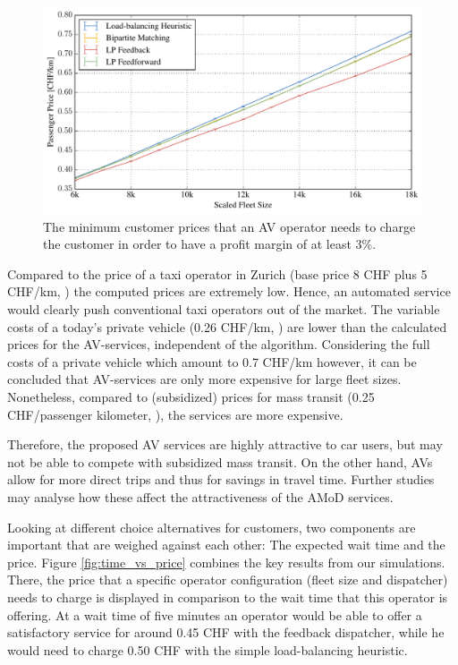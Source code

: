 \begin{figure}
\includegraphics[width=1.0\textwidth]{figures/01_passenger_price.pdf}
\caption{The minimum customer prices that an AV operator needs to charge the customer
in order to have a profit margin of at least 3\%.}
\label{fig:passenger_price}
\end{figure}

Compared to the price of a taxi operator in Zurich (base price 8 CHF plus 5 CHF/km, \cite{StadtZurich2014})
the computed prices are extremely low. Hence, an automated service would clearly
push conventional taxi operators out of the market. The variable costs of a today's private vehicle (0.26 CHF/km, \cite{TCS2016}) are lower than the calculated prices for the AV-services, independent of the algorithm. Considering the full costs of a private vehicle which amount to 0.7 CHF/km \cite{TCS2016} however, it can be concluded that AV-services are only more expensive for large fleet sizes. Nonetheless, compared to
(subsidized) prices for mass transit (0.25 CHF/passenger kilometer, \cite{Bosch2016a}), the services are more
expensive.

Therefore, the proposed AV services are highly attractive to car users, but may
not be able to compete with subsidized mass transit. On the other hand, AVs
allow for more direct trips and thus for savings in travel time. Further studies
may analyse how these affect the attractiveness of the AMoD services.

Looking at different choice alternatives for customers, two components are important
that are weighed against each other: The expected wait time and the price. Figure
\ref{fig:time_vs_price} combines the key results from our simulations. There,
the price that a specific operator configuration (fleet size and dispatcher)
needs to charge is
displayed in comparison to the wait time that this operator is offering.
At a wait time of five minutes an operator would be able to offer a satisfactory service
for around 0.45 CHF with the feedback dispatcher, while he would need to charge
0.50 CHF with the simple load-balancing heuristic. 


